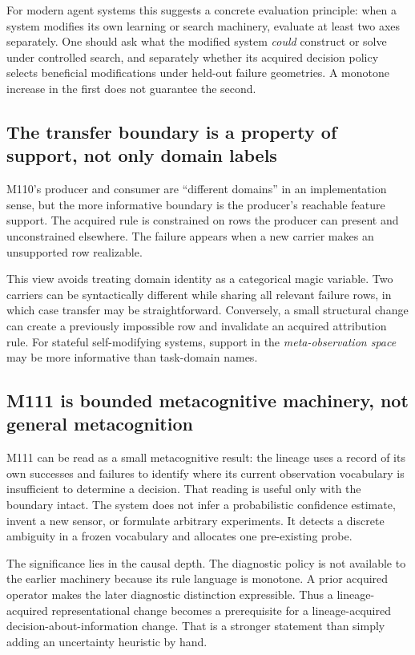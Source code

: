 For modern agent systems this suggests a concrete evaluation principle: when a system modifies its own learning or search machinery, evaluate at least two axes separately. One should ask what the modified system \emph{could} construct or solve under controlled search, and separately whether its acquired decision policy selects beneficial modifications under held-out failure geometries. A monotone increase in the first does not guarantee the second.

\subsection{The transfer boundary is a property of support, not only domain labels}
M110's producer and consumer are ``different domains'' in an implementation sense, but the more informative boundary is the producer's reachable feature support. The acquired rule is constrained on rows the producer can present and unconstrained elsewhere. The failure appears when a new carrier makes an unsupported row realizable.

This view avoids treating domain identity as a categorical magic variable. Two carriers can be syntactically different while sharing all relevant failure rows, in which case transfer may be straightforward. Conversely, a small structural change can create a previously impossible row and invalidate an acquired attribution rule. For stateful self-modifying systems, support in the \emph{meta-observation space} may be more informative than task-domain names.

\subsection{M111 is bounded metacognitive machinery, not general metacognition}
M111 can be read as a small metacognitive result: the lineage uses a record of its own successes and failures to identify where its current observation vocabulary is insufficient to determine a decision. That reading is useful only with the boundary intact. The system does not infer a probabilistic confidence estimate, invent a new sensor, or formulate arbitrary experiments. It detects a discrete ambiguity in a frozen vocabulary and allocates one pre-existing probe.

The significance lies in the causal depth. The diagnostic policy is not available to the earlier machinery because its rule language is monotone. A prior acquired operator makes the later diagnostic distinction expressible. Thus a lineage-acquired representational change becomes a prerequisite for a lineage-acquired decision-about-information change. That is a stronger statement than simply adding an uncertainty heuristic by hand.

